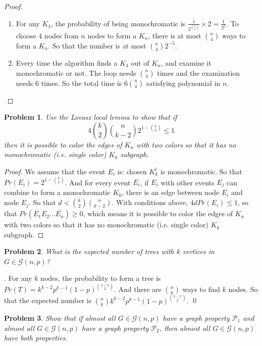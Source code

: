 \documentclass[12pt]{article}
\newtheorem{hw}{Problem}
\newenvironment{sol}
  {\par\vspace{3mm}\noindent{\it Solution}.}
  {\qed}
\begin{document}
\begin{proof}
    \begin{enumerate}
        \item For any $K_4$, the probability of being monochromatic is $\frac{1}{2^{\binom{4}{2} }}\times 2=\frac{1}{2^5}$. To choose $4$ nodes from $n$ nodes to form a $K_n$, there is at most $\binom{n}{4} $ ways to form a $K_n$. So that the number is at most ${n\choose 4}2^{-5}$.
        \item Every time the algorithm finds a $K_4$ out of $K_n$, and examine it monochromatic or not. The loop needs $\binom{n}{4} $ times and the examination needs $6$ times. So the total time is $6\binom{n}{4} $ satisfying polynomial in $n$.
    \end{enumerate}
\end{proof}


\begin{hw}
Use the Lovasz local lemma to show that if \[4 {k \choose 2} {n \choose {k-2}}2^{1-{k\choose 2}}\leq 1\]
then it is possible to color the edges of $K_n$ with two colors so that it has no monochromatic (i.e. single color) $K_k$ subgraph.
\end{hw}

\begin{proof}
    We assume that the event $E_i$ is: chosen $K_k^i$ is monochromatic. So that $Pr(E_i)=2^{1-\binom{k}{2} }$. And for every event $E_i$, if $E_i$ with other events $E_j$ can combine to form a monochromatic $K_k$, there is an edge between node $E_i$ and node $E_j$.
    So that $d< {k \choose 2} {n \choose {k-2}}$. With conditions above, $4dPr(E_i)\leq 1$, so that $Pr(\overline{E_1}\overline{E_2}\ldots \overline{E_n})\geq 0$, which means it is possible to color the edges of $K_n$ with two colors so that it has no monochromatic (i.e. single color) $K_k$ subgraph.
\end{proof}


\begin{hw}
What is the expected number of trees with $k$ vertices in $G\in \mathcal{G}(n,p)$?
\end{hw}

\begin{sol}
    For any $k$ nodes, the probability to form a tree is $Pr(T)= k^{k-2}p^{k-1}(1-p)^{\binom{k-2}{2} }$.
    And there are $\binom{n}{k} $ ways to find $k$ nodes. So that the expected number is $\binom{n}{k}k^{k-2}p^{k-1}(1-p)^{\binom{k-2}{2} } $.
\end{sol}


\begin{hw}
Show that if almost all $G\in \mathcal{G}(n,p)$ have a graph property $\mathcal{P}_1$ and almost all $G\in \mathcal{G}(n,p)$ have a graph property $\mathcal{P}_2$, then almost all $G\in \mathcal{G}(n,p)$ have both properties.
\end{hw}
\end{document}
